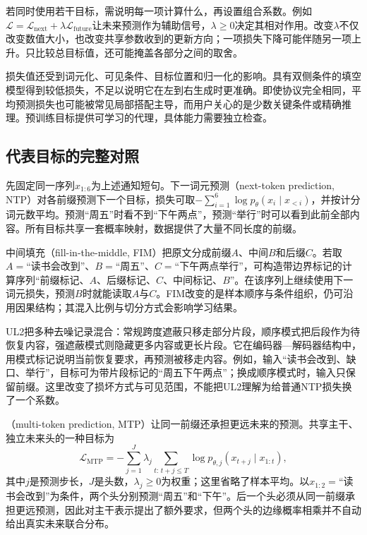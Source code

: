 若同时使用若干目标，需说明每一项计算什么，再设置组合系数。例如$\mathcal L=\mathcal L_{\mathrm{next}}+\lambda\mathcal L_{\mathrm{future}}$让未来预测作为辅助信号，$\lambda\geq0$决定其相对作用。改变$\lambda$不仅改变数值大小，也改变共享参数收到的更新方向；一项损失下降可能伴随另一项上升。只比较总目标值，还可能掩盖各部分之间的取舍。

损失值还受到词元化、可见条件、目标位置和归一化的影响。具有双侧条件的填空模型得到较低损失，不足以说明它在左到右生成时更准确。即使协议完全相同，平均预测损失也可能被常见局部搭配主导，而用户关心的是少数关键条件或精确推理。预训练目标提供可学习的代理，具体能力需要独立检查。

\subsection{代表目标的完整对照}
\label{sec:nlp-llm-objective-comparison}

先固定同一序列$x_{1:6}$为上述通知短句。下一词元预测（next-token prediction, NTP）对各前缀预测下一个目标，损失可取$-\sum_{i=1}^{6}\log p_\theta(x_i\mid x_{<i})$，并按计分词元数平均。预测“周五”时看不到“下午两点”，预测“举行”时可以看到此前全部内容。所有目标共享一套概率映射，数据提供了大量不同长度的前缀。

中间填充（fill-in-the-middle, FIM）把原文分成前缀$A$、中间$B$和后缀$C$。若取$A=$“读书会改到”、$B=$“周五”、$C=$“下午两点举行”，可构造带边界标记的计算序列“前缀标记、$A$、后缀标记、$C$、中间标记、$B$”。在该序列上继续使用下一词元损失，预测$B$时就能读取$A$与$C$。FIM改变的是样本顺序与条件组织，仍可沿用因果结构；其混入比例与切分方式会影响学习结果。

UL2把多种去噪记录混合：常规跨度遮蔽只移走部分片段，顺序模式把后段作为待恢复内容，强遮蔽模式则隐藏更多内容或更长片段。它在编码器—解码器结构中，用模式标记说明当前恢复要求，再预测被移走内容。例如，输入“读书会改到、缺口、举行”，目标可为带片段标记的“周五下午两点”；换成顺序模式时，输入只保留前缀。这里改变了损坏方式与可见范围，不能把UL2理解为给普通NTP损失换了一个系数。

（multi-token prediction, MTP）让同一前缀还承担更远未来的预测。共享主干、独立未来头的一种目标为
\begin{equation}
 \mathcal L_{\mathrm{MTP}}=
 -\sum_{j=1}^{J}\lambda_j
 \sum_{t:\,t+j\leq T}
 \log p_{\theta,j}(x_{t+j}\mid x_{1:t}),
 \label{eq:nlp-llm-mtp}
\end{equation}
其中$j$是预测步长，$J$是头数，$\lambda_j\geq0$为权重；这里省略了样本平均。以$x_{1:2}=$“读书会改到”为条件，两个头分别预测“周五”和“下午”。后一个头必须从同一前缀承担更远预测，因此对主干表示提出了额外要求，但两个头的边缘概率相乘并不自动给出真实未来联合分布。

